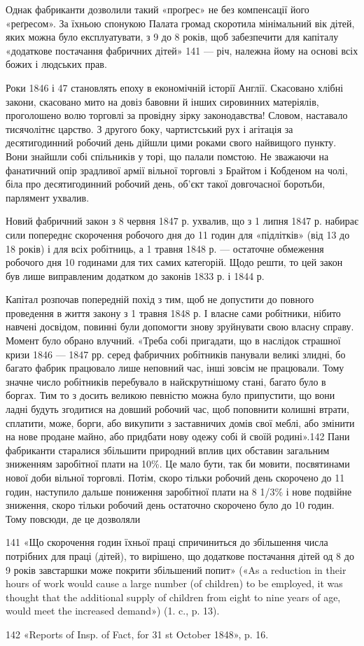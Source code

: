 Однак фабриканти дозволили такий «проґрес» не без компенсації
його «реґресом». За їхньою спонукою Палата громад скоротила
мінімальний вік дітей, яких можна було експлуатувати,
з 9 до 8 років, щоб забезпечити для капіталу «додаткове постачання
фабричних дітей» 141 — річ, належна йому на основі всіх
божих і людських прав.

Роки 1846 і 47 становлять епоху в економічній історії Англії.
Скасовано хлібні закони, скасовано мито на довіз бавовни й
інших сировинних матеріялів, проголошено волю торговлі за
провідну зірку законодавства! Словом, наставало тисячолітнє
царство. З другого боку, чартистський рух і агітація за десятигодинний
робочий день дійшли цими роками свого найвищого
пункту. Вони знайшли собі спільників у торі, що палали помстою.
Не зважаючи на фанатичний опір зрадливої армії вільної торговлі
з Брайтом і Кобденом на чолі, біла про десятигодинний робочий
день, об’єкт такої довгочасної боротьби, парлямент ухвалив.

Новий фабричний закон з 8 червня 1847 р. ухвалив, що з
1 липня 1847 р. набирає сили попереднє скорочення робочого дня
до 11 годин для «підлітків» (від 13 до 18 років) і для всіх робітниць,
а 1 травня 1848 р. — остаточне обмеження робочого
дня 10 годинами для тих самих категорій. Щодо решти, то цей
закон був лише виправленим додатком до законів 1833 р. і 1844 р.

Капітал розпочав попередній похід з тим, щоб не допустити
до повного проведення в життя закону з 1 травня 1848 р. І власне
сами робітники, нібито навчені досвідом, повинні були допомогти
знову зруйнувати свою власну справу. Момент було обрано влучний.
«Треба собі пригадати, що в наслідок страшної кризи 1846 —
1847 рр. серед фабричних робітників панували великі злидні,
бо багато фабрик працювало лише неповний час, інші зовсім не
працювали. Тому значне число робітників перебувало в найскрутнішому
стані, багато було в боргах. Тим то з досить великою
певністю можна було припустити, що вони ладні будуть згодитися
на довший робочий час, щоб поповнити колишні втрати, сплатити,
може, борги, або викупити з заставничих домів свої меблі, або
змінити на нове продане майно, або придбати нову одежу собі й
своїй родині».142 Пани фабриканти старалися збільшити природний
вплив цих обставин загальним зниженням заробітної плати
на 10\%. Це мало бути, так би мовити, посвятинами нової доби
вільної торговлі. Потім, скоро тільки робочий день скорочено
до 11 годин, наступило дальше пониження заробітної плати на
8 1/3\% і нове подвійне зниження, скоро тільки робочий день остаточно
скорочено було до 10 годин. Тому повсюди, де це дозволяли

141 «Що скорочення годин їхньої праці спричиниться до збільшення
числа потрібних для праці (дітей), то вирішено, що додаткове постачання
дітей од 8 до 9 років завстаршки може покрити збільшений
попит» («As a reduction in their hours of work would cause a large number
(of children) to be employed, it was thought that the additional supply of
children from eight to nine years of age, would meet the increased demand»)
(1. c., p. 13).

142 «Reports of Insp. of Fact, for 31 st October 1848», p. 16.
